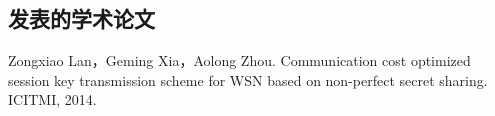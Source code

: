 \begin{resume}

  \section*{发表的学术论文} %

  \begin{enumerate}[{[}1{]}]
  \addtolength{\itemsep}{-.36\baselineskip}%
  \item Zongxiao Lan，Geming Xia，Aolong Zhou. Communication cost optimized session key transmission scheme for WSN based on non-perfect secret sharing. ICITMI, 2014.
  \end{enumerate}

\end{resume}
